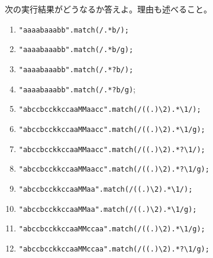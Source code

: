 
\newcommand{\makeVSPACE}{%
  \ifText\vspace{0.03\textheight}\fi}
\begin{Prob}\upshape
次の実行結果がどうなるか答えよ。理由も述べること。
\begin{enumerate}
 \item \texttt{"aaaabaaabb".match(/.*b/);}\makeVSPACE
 \item \texttt{"aaaabaaabb".match(/.*b/g);}\makeVSPACE
 \item \texttt{"aaaabaaabb".match(/.*?b/);}\makeVSPACE
 \item \texttt{"aaaabaaabb".match(/.*?b/g)};\makeVSPACE
 \item \Verb+"abccbcckkccaaMMaacc".match(/((.)\2).*\1/);+\makeVSPACE
 \item \Verb+"abccbcckkccaaMMaacc".match(/((.)\2).*\1/g);+\makeVSPACE
 \item \Verb+"abccbcckkccaaMMaacc".match(/((.)\2).*?\1/);+\makeVSPACE
 \item \Verb+"abccbcckkccaaMMaacc".match(/((.)\2).*?\1/g);+\makeVSPACE
 \item \Verb+"abccbcckkccaaMMaa".match(/((.)\2).*\1/);+\makeVSPACE
 \item \Verb+"abccbcckkccaaMMaa".match(/((.)\2).*\1/g);+\makeVSPACE
 \item \Verb+"abccbcckkccaaMMccaa".match(/((.)\2).*\1/g);+\makeVSPACE
 \item \Verb+"abccbcckkccaaMMccaa".match(/((.)\2).*?\1/g);+\makeVSPACE
%
\end{enumerate}
  \end{Prob}
\iffalse
"abccbcckkccaaMMaacc".match(/((.)\2).*\1/g);
["ccbcckkccaaMMaacc"]
"abccbcckkccaaMMaacc".match(/((.)\2).*?\1/g);
["ccbcc", "ccaaMMaacc"]
"abccbcckkccaaMMccaa".match(/((.)\2).*\1/g);
["ccbcckkccaaMMcc"]
"abccbcckkccaaMMccaa".match(/((.)\2).*?\1/g);
["ccbcc", "ccaaMMcc"]
\fi